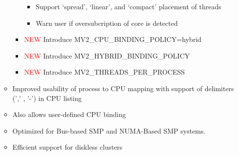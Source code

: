 \begin{itemize}
\begin{itemize}
\begin{itemize}
\begin{itemize}
              \item Support `spread', `linear', and `compact' placement of
                  threads
              \item Warn user if oversubcription of core is detected
              \end{itemize}
              \item  \textcolor{red}{NEW}  Introduce MV2\_CPU\_BINDING\_POLICY=hybrid 
              \item  \textcolor{red}{NEW}  Introduce MV2\_HYBRID\_BINDING\_POLICY
              \item  \textcolor{red}{NEW}  Introduce MV2\_THREADS\_PER\_PROCESS 
          \end{itemize}

      \item  Improved usability of process to CPU mapping with support of delimiters (',' , '-') in CPU listing
      \item  Also allows user-defined CPU binding 
      \item  Optimized for Bus-based SMP and NUMA-Based SMP systems. 
      \item  Efficient support for diskless clusters 
       
    \end{itemize}
  

\end{itemize}
